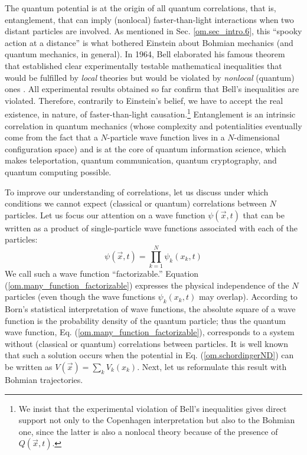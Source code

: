 \documentclass[onecolumn,nofootinbib, secnumarabic, amsmath, nobibnotes,12pt,aps,pra]{revtex4-1}
\newcommand{\sref}[1]{Sec. \ref{#1}}
\newcommand{\eref}[1]{Eq. (\ref{#1})}
\newcommand{\Eref}[1]{Equation (\ref{#1})}
\begin{document}
The quantum potential is at the origin of all quantum correlations,
that is, entanglement, that can imply (nonlocal) faster-than-light
interactions when two distant particles are involved. As mentioned
in \sref{om.sec_intro.6}, this ``spooky action at a distance'' is
what bothered Einstein about Bohmian mechanics (and quantum
mechanics, in general). In 1964, Bell elaborated his famous theorem
that established clear experimentally testable mathematical
inequalities that would be fulfilled by \textit{local} theories but
would be violated by \textit{nonlocal} (quantum) ones
\cite{om.Bell1964}. All experimental results obtained so far confirm
that Bell's inequalities are violated. Therefore, contrarily to
Einstein's belief, we have to accept the real existence, in nature,
of faster-than-light causation.\footnote{We insist that the
experimental violation of Bell's inequalities gives direct support
not only to the Copenhagen interpretation but also to the Bohmian
one, since the latter is also a nonlocal theory because of the presence of
$Q(\vec{x},t)$.} Entanglement is an intrinsic correlation in
quantum mechanics (whose complexity and potentialities eventually
come from the fact that a $N$-particle wave function lives in a
$N$-dimensional configuration space) and is at the core of quantum
information science, which makes teleportation, quantum
communication, quantum cryptography, and quantum computing possible.

To improve our understanding of correlations, let us discuss under
which conditions we cannot expect (classical or quantum)
correlations between $N$ particles. Let us focus our attention on a
wave function $\psi(\vec{x},t)$ that can be written as a product of
single-particle wave functions associated with each of the
particles:
\begin{equation}
\label{om.many_function_factorizable}
\psi(\vec{x},t) = \prod_{k = 1}^N \psi_k(x_k,t)
\end{equation}
We call such a wave function ``factorizable.'' \Eref{om.many_function_factorizable} expresses the physical independence of the $N$ particles (even though the wave functions $\psi_k(x_k,t)$ may overlap). According to Born's statistical interpretation of wave functions, the absolute square of a wave function is the probability density of the quantum particle; thus the quantum wave function, \eref{om.many_function_factorizable}, corresponds to a system without (classical or quantum) correlations between particles. It is well known that such a solution occurs when the potential in \eref{om.schordingerND} can be written as $V(\vec{x}) = \sum_k V_k(x_k)$. Next, let us reformulate this result with Bohmian trajectories.
\end{document}
